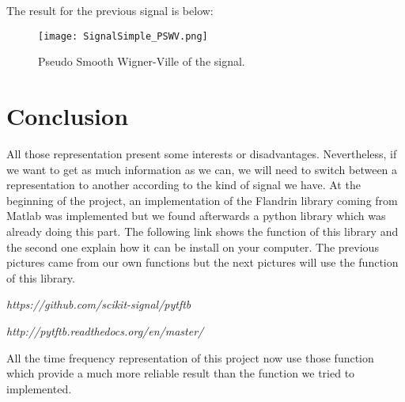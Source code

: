 The result for the previous signal is below:

\begin{figure}[H]
\centering
    \texttt{[image: SignalSimple\_PSWV.png]}
    \caption{Pseudo Smooth Wigner-Ville of the signal.}
    \label{fig:SignalSimple_PSWV}
\end{figure}

\chapter*{Conclusion}
\bigskip
All those representation present some interests or disadvantages. Nevertheless, if we want to get as much information as we can, we will need to switch between a representation to another according to the kind of signal we have. At the beginning of the project, an implementation of the Flandrin library coming from Matlab was implemented but we found afterwards a python library which was already doing this part. The following link shows the function of this library and the second one explain how it can be install on your computer. The previous pictures came from our own functions but the next pictures will use the function of this library.

\medskip

\textit{https://github.com/scikit-signal/pytftb}

\medskip

\textit{http://pytftb.readthedocs.org/en/master/}

\medskip

All the time frequency representation of this project now use those function which provide a much more reliable result than the function we tried to implemented.
